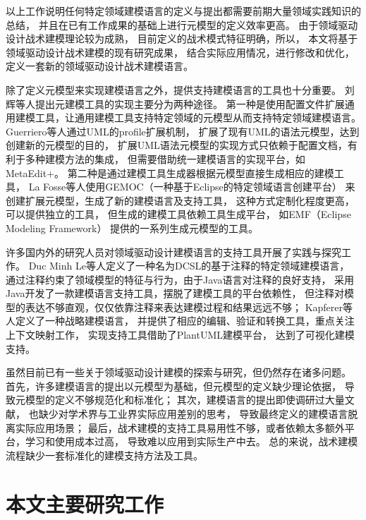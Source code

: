以上工作说明任何特定领域建模语言的定义与提出都需要前期大量领域实践知识的总结，
并且在已有工作成果的基础上进行元模型的定义效率更高。
由于领域驱动设计战术建模理论较为成熟，
目前定义的战术模式特征明确，所以，
本文将基于领域驱动设计战术建模的现有研究成果，
结合实际应用情况，进行修改和优化，
定义一套新的领域驱动设计战术建模语言。


除了定义元模型来实现建模语言之外，提供支持建模语言的工具也十分重要。
刘辉等人\cite{刘辉2008元建模技术研究进展}提出元建模工具的实现主要分为两种途径。
第一种是使用配置文件扩展通用建模工具，让通用建模工具支持特定领域的元模型从而支持特定领域建模语言。
Guerriero等人\cite{guerriero2018streamgen}通过UML的profile扩展机制，
扩展了现有UML的语法元模型，达到创建新的元模型的目的，
扩展UML语法元模型的实现方式只依赖于配置文档，有利于多种建模方法的集成，
但需要借助统一建模语言的实现平台，如MetaEdit+\footnotemark[3]。
第二种是通过建模工具生成器根据元模型直接生成相应的建模工具，
La Fosse等人\cite{la2019towards}使用GEMOC（一种基于Eclipse的特定领域语言创建平台）
来创建扩展元模型，生成了新的建模语言及支持工具，
这种方式定制化程度更高，可以提供独立的工具，
但生成的建模工具依赖工具生成平台，
如EMF（Eclipse Modeling Framework）\footnotemark[4]
提供的一系列生成元模型的工具。

许多国内外的研究人员对领域驱动设计建模语言的支持工具开展了实践与探究工作。
Duc Minh Le等人\cite{le2018domain}定义了一种名为DCSL的基于注释的特定领域建模语言，
通过注释约束了领域模型的特征与行为，由于Java语言对注释的良好支持，
采用Java开发了一款建模语言支持工具，摆脱了建模工具的平台依赖性，
但注释对模型的表达不够直观，仅仅依靠注释来表达建模过程和结果远远不够；
Kapferer等人\cite{kapferer2020domain}定义了一种战略建模语言，
并提供了相应的编辑、验证和转换工具，重点关注上下文映射工作，
实现支持工具借助了PlantUML建模平台，
达到了可视化建模支持。


虽然目前已有一些关于领域驱动设计建模的探索与研究，但仍然存在诸多问题。
首先，许多建模语言的提出以元模型为基础，但元模型的定义缺少理论依据，
导致元模型的定义不够规范化和标准化；
其次，建模语言的提出即使调研过大量文献，
也缺少对学术界与工业界实际应用差别的思考，
导致最终定义的建模语言脱离实际应用场景；
最后，战术建模的支持工具易用性不够，或者依赖太多额外平台，学习和使用成本过高，
导致难以应用到实际生产中去。
总的来说，战术建模流程缺少一套标准化的建模支持方法及工具。

\section{本文主要研究工作}

